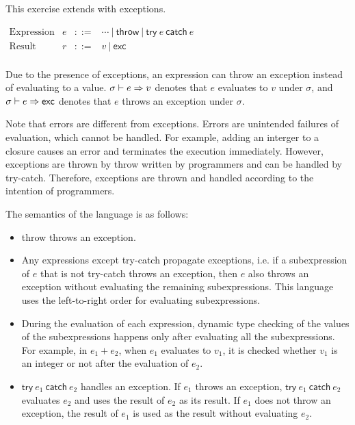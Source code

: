 \begin{exercise}

This exercise extends \lang with exceptions.

$
  \begin{array}{lrrl}
    \text{Expression} & e & ::= & \cdots\ |\ \textsf{throw}\ |\ \textsf{try}\ e\ \textsf{catch}\ e \\
    \text{Result} & r & ::= & v\ |\ \textsf{exc} \\
  \end{array}
$

Due to the presence of exceptions, an expression can throw an exception
instead of evaluating to a value. $\sigma\vdash e\Rightarrow v$ denotes that $e$
evaluates to $v$ under $\sigma$, and $\sigma\vdash e\Rightarrow\textsf{exc}$ denotes that $e$
throws an exception under $\sigma$.

Note that errors are
different from exceptions. Errors are unintended failures of evaluation, which
cannot be handled. For example, adding an interger to a closure causes an error
and terminates the execution immediately.
However, exceptions are thrown by \textsf{throw} written by programmers and
can be handled by \textsf{try-catch}. Therefore, exceptions are thrown and handled
according to the intention of programmers.

The semantics of the language is as follows:

\begin{itemize}
  \item \textsf{throw} throws an exception.
  \item Any expressions except \textsf{try-catch} propagate exceptions, i.e. if a
    subexpression of $e$ that is not \textsf{try-catch} throws an exception, then
    $e$ also throws an exception without evaluating the remaining subexpressions.
    This language uses the left-to-right order for evaluating subexpressions.
  \item During the evaluation of each expression,
    dynamic type checking of the values of the subexpressions happens only after
    evaluating all the subexpressions. For example, in $e_1+e_2$, when $e_1$
    evaluates to $v_1$, it is checked whether $v_1$ is an integer or not after
    the evaluation of $e_2$.
  \item $\textsf{try}\ e_1\ \textsf{catch}\ e_2$ handles an exception. If $e_1$ throws
    an exception, $\textsf{try}\ e_1\ \textsf{catch}\ e_2$ evaluates $e_2$ and uses the
    result of $e_2$ as its result. If $e_1$ does not throw an exception, the
    result of $e_1$ is used as the result without evaluating $e_2$.
\end{itemize}


\end{exercise}
